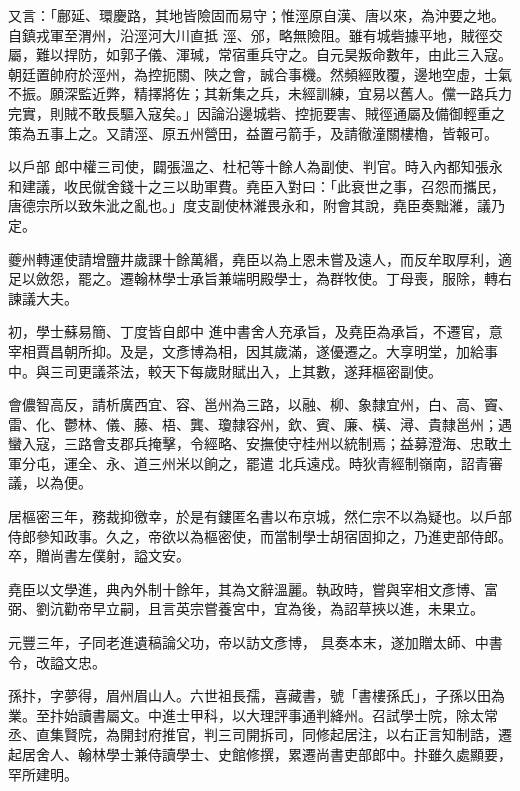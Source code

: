 \begin{pinyinscope}
 又言：「鄜延、環慶路，其地皆險固而易守；惟涇原自漢、唐以來，為沖要之地。自鎮戎軍至渭州，沿涇河大川直抵
 涇、邠，略無險阻。雖有城砦據平地，賊徑交屬，難以捍防，如郭子儀、渾瑊，常宿重兵守之。自元昊叛命數年，由此三入寇。朝廷置帥府於涇州，為控扼關、陜之會，誠合事機。然頻經敗覆，邊地空虛，士氣不振。願深監近弊，精擇將佐；其新集之兵，未經訓練，宜易以舊人。儻一路兵力完實，則賊不敢長驅入寇矣。」因論沿邊城砦、控扼要害、賊徑通屬及備御輕重之策為五事上之。又請涇、原五州營田，益置弓箭手，及請徹潼關樓櫓，皆報可。



 以戶部
 郎中權三司使，闢張溫之、杜杞等十餘人為副使、判官。時入內都知張永和建議，收民僦舍錢十之三以助軍費。堯臣入對曰：「此衰世之事，召怨而攜民，唐德宗所以致朱泚之亂也。」度支副使林濰畏永和，附會其說，堯臣奏黜濰，議乃定。



 夔州轉運使請增鹽井歲課十餘萬緡，堯臣以為上恩未嘗及遠人，而反牟取厚利，適足以斂怨，罷之。遷翰林學士承旨兼端明殿學士，為群牧使。丁母喪，服除，轉右諫議大夫。



 初，學士蘇易簡、丁度皆自郎中
 進中書舍人充承旨，及堯臣為承旨，不遷官，意宰相賈昌朝所抑。及是，文彥博為相，因其歲滿，遂優遷之。大享明堂，加給事中。與三司更議茶法，較天下每歲財賦出入，上其數，遂拜樞密副使。



 會儂智高反，請析廣西宜、容、邕州為三路，以融、柳、象隸宜州，白、高、竇、雷、化、鬱林、儀、藤、梧、龔、瓊隸容州，欽、賓、廉、橫、潯、貴隸邕州；遇蠻入寇，三路會支郡兵掩擊，令經略、安撫使守桂州以統制焉；益募澄海、忠敢土軍分屯，運全、永、道三州米以餉之，罷遣
 北兵遠戍。時狄青經制嶺南，詔青審議，以為便。



 居樞密三年，務裁抑徼幸，於是有鏤匿名書以布京城，然仁宗不以為疑也。以戶部侍郎參知政事。久之，帝欲以為樞密使，而當制學士胡宿固抑之，乃進吏部侍郎。卒，贈尚書左僕射，謚文安。



 堯臣以文學進，典內外制十餘年，其為文辭溫麗。執政時，嘗與宰相文彥博、富弼、劉沆勸帝早立嗣，且言英宗嘗養宮中，宜為後，為詔草挾以進，未果立。



 元豐三年，子同老進遺稿論父功，帝以訪文彥博，
 具奏本末，遂加贈太師、中書令，改謚文忠。



 孫抃，字夢得，眉州眉山人。六世祖長孺，喜藏書，號「書樓孫氏」，子孫以田為業。至抃始讀書屬文。中進士甲科，以大理評事通判絳州。召試學士院，除太常丞、直集賢院，為開封府推官，判三司開拆司，同修起居注，以右正言知制誥，遷起居舍人、翰林學士兼侍讀學士、史館修撰，累遷尚書吏部郎中。抃雖久處顯要，罕所建明。




\end{pinyinscope}
